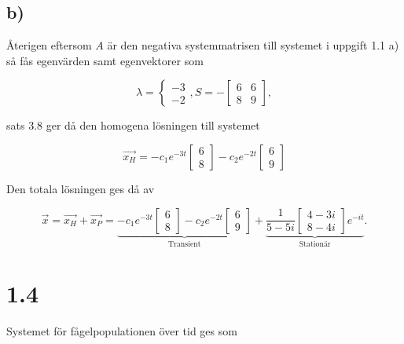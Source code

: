 \documentclass[a4paper]{article}
\newcommand{\mat}[1]{\bm{\mathit{#1}}}
\begin{document}
\subsection*{b)}

Återigen eftersom $\mat{A}$ är den negativa systemmatrisen till systemet i
uppgift 1.1 a) så fås egenvärden samt egenvektorer som

\begin{equation*}
  \lambda = \begin{cases}-3\\-2\end{cases}, \mat{S} = -\begin{bmatrix}6 & 6\\8 & 9\end{bmatrix},
\end{equation*}
  
\noindent sats 3.8 ger då den homogena lösningen till systemet

\begin{equation*}
  \vec{x_H} = -c_1e^{-3t}\begin{bmatrix}6\\8\end{bmatrix} - c_2e^{-2t}\begin{bmatrix}6\\9\end{bmatrix}
\end{equation*}

\noindent Den totala lösningen ges då av

\begin{equation*}
  \vec{x} = \vec{x_H} + \vec{x_P} = \underbrace{-c_1e^{-3t}\begin{bmatrix}6\\8\end{bmatrix} - c_2e^{-2t}\begin{bmatrix}6\\9\end{bmatrix}}_{\text{Transient}} + \underbrace{\frac{1}{5-5i}\begin{bmatrix}4-3i\\8-4i\end{bmatrix}e^{-it}}_{\text{Stationär}}.
\end{equation*}

\section*{1.4}

Systemet för fågelpopulationen över tid ges som
\end{document}
